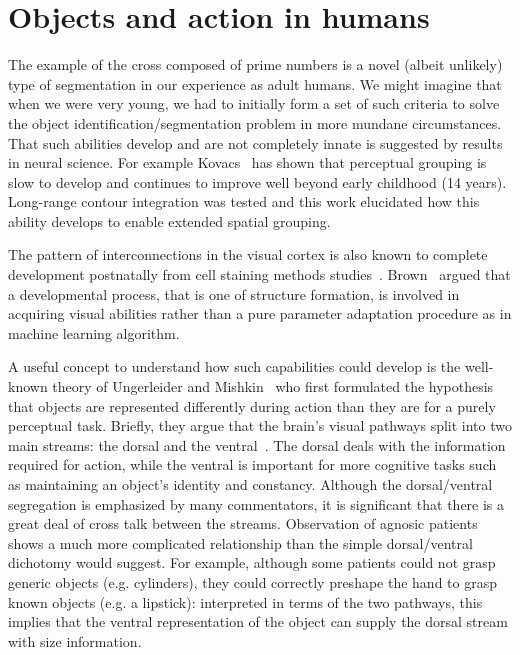 
\section{Objects and action in humans}


The example of the cross composed of prime numbers is a novel (albeit
unlikely) type of segmentation in our experience as adult humans.  We
might imagine that when we were very young, we had to initially form a
set of such criteria to solve the object identification/segmentation
problem in more mundane circumstances. 
%
That such abilities
develop and are not completely innate is suggested by results in
neural science. For example Kovacs~\cite{kovacs00human} has shown that
perceptual grouping is slow to develop and continues to improve well
beyond early childhood (14 years). Long-range contour integration was
tested and this work elucidated how this ability develops to enable
extended spatial grouping.

\ifverbose
The pattern of interconnections in the visual cortex is also known
to complete development postnatally from cell staining methods
studies~\cite{burkhalter93development,callaway92development}.
Brown~\cite{brown94vision} argued that a developmental process, that
is one of structure formation, is involved in acquiring visual
abilities rather than a pure parameter adaptation procedure as in
machine learning algorithm.
\fi 

A useful concept to understand how such capabilities could develop is the
well-known theory of Ungerleider and Mishkin~\cite{ungerleider82two}
who first formulated the hypothesis that objects are represented
differently during action than they are for a purely perceptual task.
Briefly, they argue that the brain's visual pathways split into two
main streams: the dorsal and the ventral~\cite{milner95visual}. The
dorsal deals with the information required for action, while the
ventral is important for more cognitive tasks such as maintaining an
object's identity and constancy.  Although the dorsal/ventral
segregation is emphasized by many commentators, it is significant that
there is a great deal of cross talk between the streams.  Observation
of agnosic patients~\cite{jeannerod97cognitive} shows a much more
complicated relationship than the simple dorsal/ventral dichotomy
would suggest.  For example, although some patients could not grasp
generic objects (e.g.  cylinders), they could correctly preshape the
hand to grasp known objects (e.g. a lipstick): interpreted in terms of
the two pathways, this implies that the ventral representation of the
object can supply the dorsal stream with size information.


